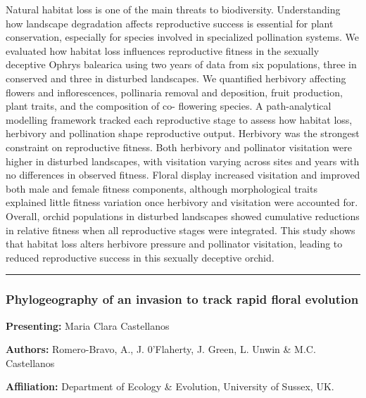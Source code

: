 \documentclass[
  letterpaper,
  DIV=11,
  numbers=noendperiod]{scrartcl}
\begin{document}
Natural habitat loss is one of the main threats to biodiversity.
Understanding how landscape degradation affects reproductive success is
essential for plant conservation, especially for species involved in
specialized pollination systems. We evaluated how habitat loss
influences reproductive fitness in the sexually deceptive Ophrys
balearica using two years of data from six populations, three in
conserved and three in disturbed landscapes. We quantified herbivory
affecting flowers and inflorescences, pollinaria removal and deposition,
fruit production, plant traits, and the composition of co- flowering
species. A path-analytical modelling framework tracked each reproductive
stage to assess how habitat loss, herbivory and pollination shape
reproductive output. Herbivory was the strongest constraint on
reproductive fitness. Both herbivory and pollinator visitation were
higher in disturbed landscapes, with visitation varying across sites and
years with no differences in observed fitness. Floral display increased
visitation and improved both male and female fitness components,
although morphological traits explained little fitness variation once
herbivory and visitation were accounted for. Overall, orchid populations
in disturbed landscapes showed cumulative reductions in relative fitness
when all reproductive stages were integrated. This study shows that
habitat loss alters herbivore pressure and pollinator visitation,
leading to reduced reproductive success in this sexually deceptive
orchid.

\begin{center}\rule{0.5\linewidth}{0.5pt}\end{center}

\subsubsection{Phylogeography of an invasion to track rapid floral
evolution}\label{phylogeography-of-an-invasion-to-track-rapid-floral-evolution}

\textbf{Presenting:} Maria Clara Castellanos

\textbf{Authors:} Romero-Bravo, A., J. 0'Flaherty, J. Green, L. Unwin \&
M.C. Castellanos

\textbf{Affiliation:} Department of Ecology \& Evolution, University of
Sussex, UK.
\end{document}
